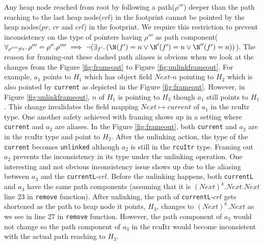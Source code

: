 Any heap node reached from root by following a path($\rho'''$) deeper than the path reaching to the last heap node($crl$) in the footprint cannot be pointed by the heap nodes($pr$, $cr$ and $crl$) in the footprint. We require this restriction to prevent inconsistency on the type of pointers having $\rho'''$ as path component($\forall_{\rho''''\neq \epsilon} \ldotp \rho''' = \rho''.\rho'''' \implies \lnot(\exists_{f'}\ldotp ( \N(f')=n \lor \N'(f')=n  \lor \N''(f')=n ))$). The reason for framing-out these dashed path aliases is obvious when we look at the changes from the Figure \ref{fig:frameout} to Figure \ref{fig:unlinkframeout}. For example, $a_1$ points to $H_1$ which has object field $Next$-$n$ pointing to $H_2$ which is also pointed by \texttt{current} as depicted in the Figure \ref{fig:frameout}. However, in Figure \ref{fig:unlinkframeout}, $n$ of $H_1$ is pointing to $H_3$ though $a_1$ still points to $H_1$. This change invalidates the field mapping $Next \mapsto current$ of $a_1$ in the \textsf{rcuItr} type. One another safety achieved with framing shows up in a setting where \texttt{current} and $a_2$ are aliases. In the Figure \ref{fig:frameout}, both \texttt{current} and $a_2$ are in the \textsf{rcuItr} type and point to $H_2$. After the unlinking action, the type of the \texttt{current} becomes \texttt{unlinked} although $a_2$ is still in the \texttt{rcuItr} type. Framing out $a_2$ prevents the inconsistency in its type under the unlinking operation. One interesting and not obvious inconsistency issue shows up due to the aliasing between $a_3$ and the \texttt{currentL}-$crl$. Before the unlinking happens, both \texttt{currentL} and $a_3$ have the same path components (assuming that it is $(Next)^{k}.Next.Next$ line 23 in \texttt{remove} function). After unlinking, the path of \texttt{currentL}-$crl$ gets shortened as the path to heap node it points, $H_3$, changes  to $(Next)^{k}.Next$ as we see in line 27 in \texttt{remove} function. However, the path component of $a_3$  would not change so the path component of $a_3$ in the \textsf{rcuItr} would become inconsistent with the actual path reaching to $H_3$.
